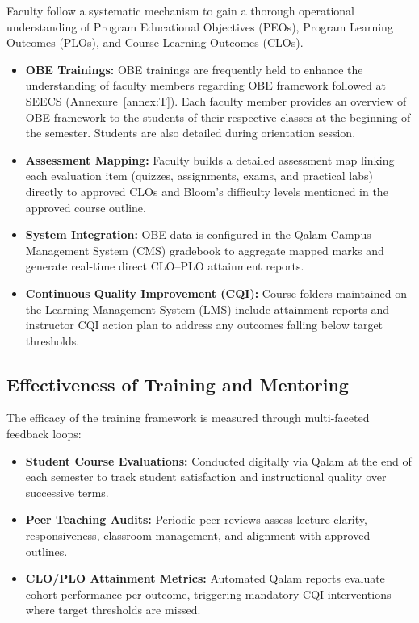 Faculty follow a systematic mechanism to gain a thorough operational understanding of Program Educational Objectives (PEOs), Program Learning Outcomes (PLOs), and Course Learning Outcomes (CLOs). 
\begin {itemize}[noitemsep, topsep=0pt]
\item \textbf{OBE Trainings:} OBE trainings are frequently held to enhance the understanding of faculty members regarding OBE framework followed at SEECS (Annexure~\ref{annex:T}). Each faculty member provides an overview of OBE framework to the students of their respective classes at the beginning of the semester. Students are also detailed during orientation session.
\item \textbf{Assessment Mapping:} Faculty builds a detailed assessment map linking each evaluation item (quizzes, assignments, exams, and practical labs) directly to approved CLOs and Bloom's difficulty levels mentioned in the approved course outline. 
\item \textbf{System Integration:} OBE data is configured in the Qalam Campus Management System (CMS) gradebook to aggregate mapped marks and generate real-time direct CLO–PLO attainment reports. 
\item \textbf{Continuous Quality Improvement (CQI):} Course folders maintained on the Learning Management System (LMS) include attainment reports and instructor CQI action plan to address any outcomes falling below target thresholds.
\end{itemize}

\subsection{Effectiveness of Training and Mentoring}
The efficacy of the training framework is measured through multi-faceted feedback loops:   
\begin{itemize}[noitemsep, topsep=0pt]
    \item \textbf{Student Course Evaluations:} Conducted digitally via Qalam at the end of each semester to track student satisfaction and instructional quality over successive terms.
    \item \textbf{Peer Teaching Audits:} Periodic peer reviews assess lecture clarity, responsiveness, classroom management, and alignment with approved outlines.
    \item \textbf{CLO/PLO Attainment Metrics:} Automated Qalam reports evaluate cohort performance per outcome, triggering mandatory CQI interventions where target thresholds are missed. 
\end{itemize}

